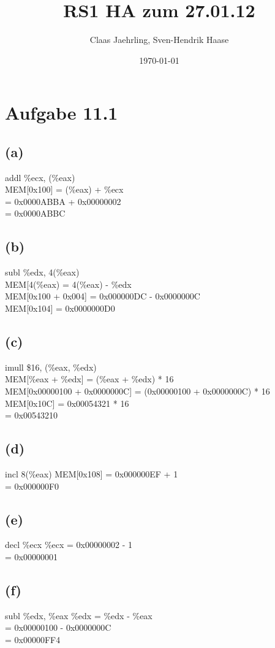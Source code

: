 \documentclass[12pt]{article}
\author{Claas Jaehrling, Sven-Hendrik Haase}
\title{RS1 HA zum 27.01.12}
\date{\today}
\begin{document}
\setcounter{secnumdepth}{0}
\maketitle

\section{Aufgabe 11.1}
\subsection{(a)}
addl \%ecx, (\%eax) \\
MEM[0x100] = (\%eax) + \%ecx \\
= 0x0000ABBA + 0x00000002 \\
= 0x0000ABBC
\subsection{(b)}
subl \%edx, 4(\%eax) \\
MEM[4(\%eax) = 4(\%eax) - \%edx \\
MEM[0x100 + 0x004] = 0x000000DC - 0x0000000C \\
MEM[0x104] = 0x0000000D0
\subsection{(c)}
imull \$16, (\%eax, \%edx) \\
MEM[\%eax + \%edx] = (\%eax + \%edx) * 16 \\
MEM[0x00000100 + 0x0000000C] = (0x00000100 + 0x0000000C) * 16 \\
MEM[0x10C] = 0x00054321 * 16 \\
= 0x00543210
\subsection{(d)}
incl 8(\%eax)
MEM[0x108] = 0x000000EF + 1 \\
= 0x000000F0
\subsection{(e)}
decl \%ecx
\%ecx = 0x00000002 - 1 \\
= 0x00000001
\subsection{(f)}
subl \%edx, \%eax
\%edx = \%edx - \%eax \\
= 0x00000100 - 0x0000000C \\
= 0x00000FF4
\end{document}
